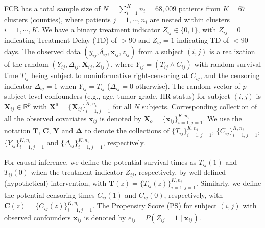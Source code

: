 \documentclass[aoas]{imsart}
\theoremstyle{plain}
\theoremstyle{definition}
\begin{document}
FCR has a total sample size of $N = \sum_{i=1}^K n_i=68,009$ patients from $K=67$ clusters (counties), where patients $j=1,\cdots, n_i$ are nested within clusters $i=1,\cdots,K$. We have a binary treatment indicator $Z_{ij} \in \{0,1\}$, with $Z_{ij}=0$ indicating Treatment Delay (TD) of $>90$  and $Z_{ij}=1$ indicating TD of $<90$ days. 
The observed data $(y_{ij},\delta_{ij},\mathbf{x}_{ij},z_{ij})$ from a subject $(i,j)$ is a realization of the random 
$(Y_{ij}, \Delta_{ij}, \mathbf{X}_{ij}, Z_{ij})$, where $Y_{ij}=(T_{ij}\wedge C_{ij})$ with random survival time $T_{ij}$ being subject to noninformative right-censoring at $C_{ij}$, and the  censoring indicator $\Delta_{ij}=1$ when $Y_{ij}=T_{ij}$ ($\Delta_{ij}=0$ otherwise). 
The random vector  of $p$ subject-level confounders  (e.g., age, tumor grade, HR status) 
for subject $(i,j)$ is $\mathbf{X}_{ij} \in \mathbb{R}^p$ with $\mathbf{X}^a = \{\mathbf{X}_{ij}\}_{i=1,j=1}^{K,n_i}$ 
for all $N$ subjects.
Corresponding collection of all the observed covariates $\mathbf{x}_{ij}$ is denoted by   $\mathbf{X}_o=\{\mathbf{x}_{ij}\}_{i=1,j=1}^{K,n_i}$.   
We use the notation $\mathbf{T}$, $\mathbf{C}$, $\mathbf{Y}$ and $\boldsymbol{\Delta}$
to denote the collections of  $\{T_{ij}\}_{i=1,j=1}^{K,n_i}$, $\{C_{ij}\}_{i=1,j=1}^{K,n_i}$,  $\{Y_{ij}\}_{i=1,j=1}^{K,n_i}$ and $\{\Delta_{ij}\}_{i=1,j=1}^{K,n_i}$, respectively. 



For causal inference, we define the potential survival times as $T_{ij}(1)$ and $T_{ij}(0)$ when the treatment indicator $Z_{ij}$, respectively, by
well-defined (hypothetical) intervention, with $\mathbf{T}(z) = \{T_{ij}(z)\}_{i=1,j=1}^{K,n_i}$. Similarly, we define the potential censoring times $C_{ij}(1)$ and $C_{ij}(0)$, respectively, with $\mathbf{C}(z) = \{C_{ij}(z)\}_{i=1,j=1}^{K,n_i}$. 
The Propensity Score (PS) for subject $(i,j)$ with observed confounders $\mathbf{x}_{ij}$ is denoted by $e_{ij} = P(Z_{ij} = 1 \mid   \mathbf{x}_{ij})$. 
\end{document}
